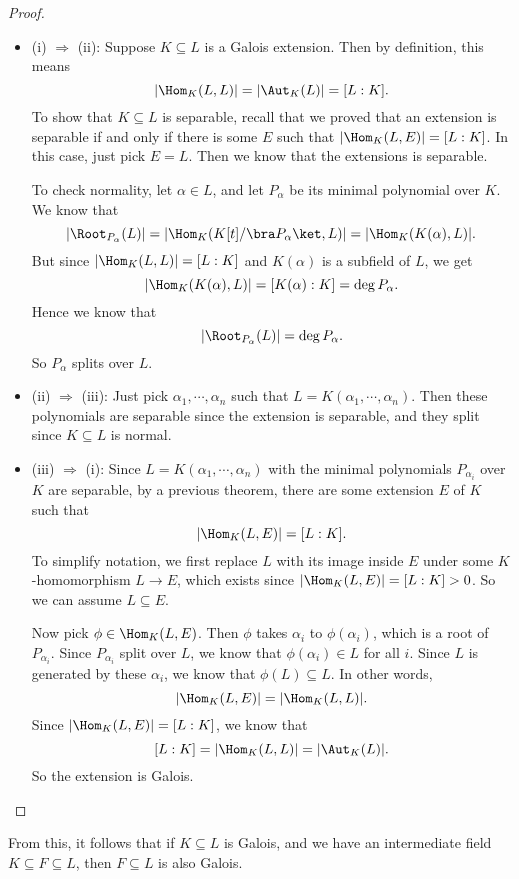 \documentclass[a4paper]{article}
\begin{document}
\begin{proof}\leavevmode
  \begin{itemize}
    \item (i) $\Rightarrow$ (ii): Suppose $K\subseteq L$ is a Galois extension. Then by definition, this means
      \[
        |\Hom_K(L, L)| = |\Aut_K(L)| = [L:K].
      \]
      To show that $K\subseteq L$ is separable, recall that we proved that an extension is separable if and only if there is some $E$ such that $|\Hom_K(L, E)| = [L:K]$. In this case, just pick $E = L$. Then we know that the extensions is separable.

      To check normality, let $\alpha \in L$, and let $P_\alpha$ be its minimal polynomial over $K$. We know that
      \[
        |\Root_{P_\alpha}(L)| = |\Hom_K(K[t]/\bra P_\alpha\ket, L)| = |\Hom_K(K(\alpha), L)|.
      \]
      But since $|\Hom_K(L, L)| = [L:K]$ and $K(\alpha)$ is a subfield of $L$, we get
      \[
        |\Hom_K(K(\alpha), L)| = [K(\alpha): K] = \deg P_\alpha.
      \]
      Hence we know that
      \[
        |\Root_{P_\alpha}(L)| = \deg P_\alpha.
      \]
      So $P_\alpha$ splits over $L$.
    \item (ii) $\Rightarrow$ (iii): Just pick $\alpha_1, \cdots, \alpha_n$ such that $L = K(\alpha_1, \cdots, \alpha_n)$. Then these polynomials are separable since the extension is separable, and they split since $K\subseteq L$ is normal.

    \item (iii) $\Rightarrow$ (i): Since $L = K(\alpha_1, \cdots, \alpha_n)$ with the minimal polynomials $P_{\alpha_i}$ over $K$ are separable, by a previous theorem, there are some extension $E$ of $K$ such that
      \[
        |\Hom_K(L, E)| = [L:K].
      \]
      To simplify notation, we first replace $L$ with its image inside $E$ under some $K$-homomorphism $L \to E$, which exists since $|\Hom_K(L, E)| = [L:K] > 0$. So we can assume $L\subseteq E$.

      Now pick $\phi \in \Hom_K(L, E)$. Then $\phi$ takes $\alpha_i$ to $\phi(\alpha_i)$, which is a root of $P_{\alpha_i}$. Since $P_{\alpha_i}$ split over $L$, we know that $\phi(\alpha_i) \in L$ for all $i$. Since $L$ is generated by these $\alpha_i$, we know that $\phi(L) \subseteq L$. In other words,
      \[
        |\Hom_K(L, E)| = |\Hom_K(L, L)|.
      \]
      Since $|\Hom_K(L, E)| = [L:K]$, we know that
      \[
        [L:K] = |\Hom_K(L, L)| = |\Aut_K(L)|.
      \]
      So the extension is Galois.
  \end{itemize}
\end{proof}
From this, it follows that if $K\subseteq L$ is Galois, and we have an intermediate field $K\subseteq F \subseteq L$, then $F\subseteq L$ is also Galois.
\end{document}
